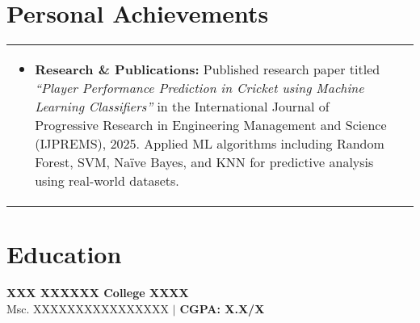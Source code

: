 \documentclass[a4paper,8pt]{article}
\begin{document}
\vspace{10pt}

\section{Personal Achievements}
\begin{tabularx}{\linewidth}{ @{}l r@{} }
\begin{minipage}[t]{\linewidth}
    \begin{itemize}[nosep,after=\strut, leftmargin=2em, itemsep=3pt]
        \item {\textbf{Research \& Publications:}} Published research paper titled \textit{“Player Performance Prediction in Cricket using Machine Learning Classifiers”} in the International Journal of Progressive Research in Engineering Management and Science (IJPREMS), 2025. Applied ML algorithms including Random Forest, SVM, Naïve Bayes, and KNN for predictive analysis using real-world datasets.
    \end{itemize}
\end{minipage}
\end{tabularx}

\vspace{10pt}

\section{Education}
\textbf{XXX XXXXXX College XXXX}\hfill \\
Msc. XXXXXXXXXXXXXXXX $|$ \textbf{CGPA: X.X/X}
\end{document}
